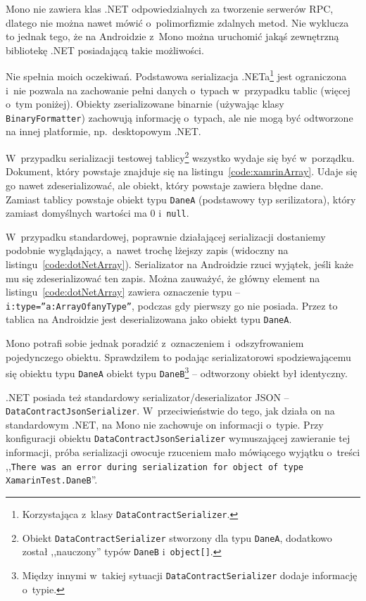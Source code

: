 \begin{description}
Mono nie zawiera klas .NET odpowiedzialnych za tworzenie serwerów RPC, dlatego nie można nawet mówić o~polimorfizmie zdalnych metod.
Nie wyklucza to jednak tego, że na Androidzie z~Mono można uruchomić jakąś zewnętrzną bibliotekę .NET posiadającą takie możliwości.

Nie spełnia moich oczekiwań.
Podstawowa serializacja .NETa\footnote{Korzystająca z~klasy \texttt{DataContractSerializer}.} jest ograniczona i~nie pozwala na zachowanie pełni danych o~typach w~przypadku tablic (więcej o~tym poniżej).
Obiekty zserializowane binarnie (używając klasy \texttt{BinaryFormatter}) zachowują informację o~typach, ale nie mogą być odtworzone na innej platformie, np.\ desktopowym .NET\@. 

W~przypadku serializacji testowej tablicy\footnote{Obiekt \texttt{DataContractSerializer} stworzony dla typu \texttt{DaneA}, dodatkowo został ,,nauczony'' typów \texttt{DaneB} i~\texttt{object[]}.} wszystko wydaje się być w~porządku. Dokument, który powstaje znajduje się na listingu~\ref{code:xamrinArray}. Udaje się go nawet zdeserializować, ale obiekt, który powstaje zawiera błędne dane. Zamiast tablicy powstaje obiekt typu \texttt{DaneA} (podstawowy typ serilizatora), który zamiast domyślnych wartości ma 0 i~\texttt{null}.

W~przypadku standardowej, poprawnie działającej serializacji dostaniemy podobnie wyglądający, a~nawet trochę lżejszy zapis (widoczny na listingu~\ref{code:dotNetArray}).
Serializator na Androidzie rzuci wyjątek, jeśli każe mu się zdeserializować ten zapis.
Można zauważyć, że główny element na listingu~\ref{code:dotNetArray} zawiera oznaczenie typu -- \texttt{i:type=''a:ArrayOfanyType''}, podczas gdy pierwszy go nie posiada. Przez to tablica na Androidzie jest  deserializowana jako obiekt typu \texttt{DaneA}.

Mono potrafi sobie jednak poradzić z~oznaczeniem i~odszyfrowaniem pojedynczego obiektu. Sprawdziłem to podając serializatorowi spodziewającemu się obiektu typu \texttt{DaneA} obiekt typu \texttt{DaneB}\footnote{Między innymi w~takiej sytuacji \texttt{DataContractSerializer} dodaje informację o~typie.} -- odtworzony obiekt był identyczny.

.NET posiada też standardowy serializator/deserializator JSON -- \texttt{DataContractJsonSerializer}.
W~przeciwieństwie do tego, jak działa on na standardowym .NET, na Mono nie zachowuje on informacji o~typie.
Przy konfiguracji obiektu \texttt{DataContractJsonSerializer} wymuszającej zawieranie tej informacji, próba serializacji owocuje rzuceniem mało mówiącego wyjątku o~treści ,,\texttt{There was an error during serialization for object of type XamarinTest.DaneB}''.


\end{description}
